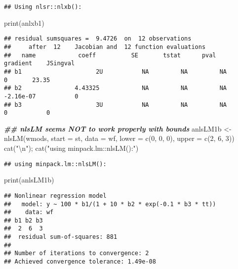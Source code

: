 \documentclass[
]{article}
\newenvironment{Shaded}{\begin{snugshade}}{\end{snugshade}}
\newcommand{\AttributeTok}[1]{\textcolor[rgb]{0.77,0.63,0.00}{#1}}
\newcommand{\DecValTok}[1]{\textcolor[rgb]{0.00,0.00,0.81}{#1}}
\newcommand{\DocumentationTok}[1]{\textcolor[rgb]{0.56,0.35,0.01}{\textbf{\textit{#1}}}}
\newcommand{\FunctionTok}[1]{\textcolor[rgb]{0.00,0.00,0.00}{#1}}
\newcommand{\NormalTok}[1]{#1}
\newcommand{\OtherTok}[1]{\textcolor[rgb]{0.56,0.35,0.01}{#1}}
\newcommand{\SpecialCharTok}[1]{\textcolor[rgb]{0.00,0.00,0.00}{#1}}
\newcommand{\StringTok}[1]{\textcolor[rgb]{0.31,0.60,0.02}{#1}}
\begin{document}
\begin{verbatim}
## Using nlsr::nlxb():
\end{verbatim}

\begin{Shaded}
\begin{Highlighting}[]
\FunctionTok{print}\NormalTok{(anlxb1)}
\end{Highlighting}
\end{Shaded}

\begin{verbatim}
## residual sumsquares =  9.4726  on  12 observations
##     after  12    Jacobian and  12 function evaluations
##   name            coeff          SE       tstat      pval      gradient    JSingval   
## b1                     2U           NA         NA         NA           0       23.35  
## b2               4.43325            NA         NA         NA   -2.16e-07           0  
## b3                     3U           NA         NA         NA           0           0
\end{verbatim}

\begin{Shaded}
\begin{Highlighting}[]
\DocumentationTok{\#\# nlsLM seems NOT to work properly with bounds}
\NormalTok{anlsLM1b }\OtherTok{\textless{}{-}} \FunctionTok{nlsLM}\NormalTok{(wmods, }\AttributeTok{start =}\NormalTok{ st, }\AttributeTok{data =}\NormalTok{ wf, }\AttributeTok{lower =} \FunctionTok{c}\NormalTok{(}\DecValTok{0}\NormalTok{, }\DecValTok{0}\NormalTok{, }\DecValTok{0}\NormalTok{), }\AttributeTok{upper =} \FunctionTok{c}\NormalTok{(}\DecValTok{2}\NormalTok{, }\DecValTok{6}\NormalTok{, }\DecValTok{3}\NormalTok{))}
\FunctionTok{cat}\NormalTok{(}\StringTok{"}\SpecialCharTok{\textbackslash{}n}\StringTok{"}\NormalTok{); }\FunctionTok{cat}\NormalTok{(}\StringTok{"using minpack.lm::nlsLM():"}\NormalTok{)}
\end{Highlighting}
\end{Shaded}

\begin{verbatim}
## using minpack.lm::nlsLM():
\end{verbatim}

\begin{Shaded}
\begin{Highlighting}[]
\FunctionTok{print}\NormalTok{(anlsLM1b)}
\end{Highlighting}
\end{Shaded}

\begin{verbatim}
## Nonlinear regression model
##   model: y ~ 100 * b1/(1 + 10 * b2 * exp(-0.1 * b3 * tt))
##    data: wf
## b1 b2 b3 
##  2  6  3 
##  residual sum-of-squares: 881
## 
## Number of iterations to convergence: 2 
## Achieved convergence tolerance: 1.49e-08
\end{verbatim}
\end{document}
